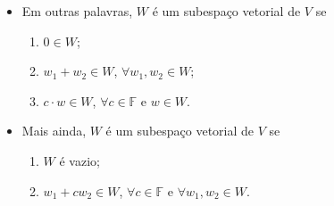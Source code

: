 \begin{itemize}
	\item

	      Em outras palavras, $W$ é um subespaço vetorial de $V$ se

	      \begin{enumerate}
		      \item

		            $0\in W$;

		      \item

		            $w_{1}+w_{2}\in W$, $\forall w_{1},w_{2}\in W$;

		      \item

		            $c\cdot w\in W$, $\forall c\in\mathbb{F}$ e $w\in W$.
	      \end{enumerate}
	\item

	      Mais ainda, $W$ é um subespaço vetorial de $V$ se
	      \begin{enumerate}
		      \item

		            $W$ é  vazio;

		      \item

		            $w_{1}+cw_{2}\in W$, $\forall c\in\mathbb{F}$ e
		            $\forall w_{1},w_{2}\in W$.
	      \end{enumerate}
\end{itemize}

